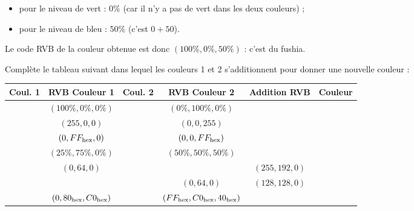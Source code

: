 \documentclass[class=report,crop=false, 12pt]{standalone}
\begin{document}
\begin{activite}
\begin{enumerate}
\begin{itemize}
  \item pour le niveau de vert : $0\%$ (car il n'y a pas de vert dans les deux couleurs) ;
  
  \item pour le niveau de bleu : $50\%$ (c'est $0+50$).
\end{itemize}
Le code RVB de la couleur obtenue est donc $(100\%, 0\%,50\%)$ : c'est du fushia.



Complète le tableau suivant dans lequel les couleurs 1 et 2 s'additionnent pour donner une nouvelle couleur :


\begin{center}
\begin{tabular}{|c|c|c|c|c|c|}
\hline
Coul. 1 &  RVB Couleur 1  & Coul. 2 & RVB Couleur 2 & Addition RVB & Couleur \\ \hline
\cellcolor{red}  & $(100\%,0\%,0\%)$ & \cellcolor{green} & $(0\%,100\%,0\%)$ &  & \cellcolor{yellow} \\ \hline
\cellcolor{red}  & $(255,0,0)$       & \cellcolor{blue}   & $(0,0,255)$       &   & \\ \hline
                 & $(0,FF_{\text{hex}},0)$  &                    & $(0,0,FF_{\text{hex}})$   &   & \\ \hline
 & $(25\%,75\%,0\%)$ & & $(50\%,50\%,50\%)$ & & \\ \hline                   
 & $(0,64,0)$ &  & & $(255,192,0)$ & \\ \hline
 &  &  & $(0,64,0)$ & $(128,128,0)$ & \\ \hline     
 & $(0,80_{\text{hex}},C0_{\text{hex}})$ & & $(FF_{\text{hex}},C0_{\text{hex}},40_{\text{hex}})$ & & \\ \hline            
\end{tabular}
\end{center} 
\end{enumerate}

\end{activite}
\end{document}
